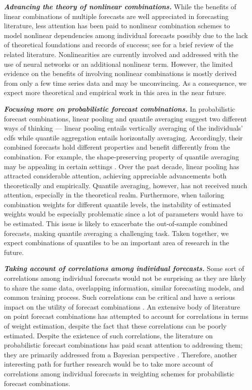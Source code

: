 \documentclass[11pt]{article}
\begin{document}
\textbf{\textit{Advancing the theory of nonlinear combinations.}} While the benefits of linear combinations of multiple forecasts are well appreciated in forecasting literature, less attention has been paid to nonlinear combination schemes to model nonlinear dependencies among individual forecasts possibly due to the lack of theoretical foundations and records of success; see \citet{Timmermann2006-en} for a brief review of the related literature. Nonlinearities are currently involved and addressed with the use of neural networks or an additional nonlinear term. However, the limited evidence on the benefits of involving nonlinear combinations is mostly derived from only a few time series data and may be unconvincing. As a consequence, we expect more theoretical and empirical work in this area in the near future.

\textbf{\textit{Focusing more on probabilistic forecast combinations.}} In probabilistic forecast combinations, linear pooling and quantile averaging suggest two different ways of thinking --- linear pooling entails vertically averaging of the individuals' cdfs while quantile aggregation entails horizontally averaging. Accordingly, their combined forecasts hold different properties and benefit differently from the combination. For example, the shape-preserving property of quantile averaging may be appealing in certain settings \citep{Lichtendahl2013-rt}. Over the past decade, linear pooling has attracted considerable attention, achieving appreciable advancements both theoretically and empirically. Quantile averaging, however, has not received much attention, especially in the theoretical realm. Furthermore, when tailoring combination weights for different quantile levels, the instability of estimated weights would be especially problematic since a lot of parameters would have to be estimated. This issue is likely to exacerbate the out-of-sample combined forecasts, making quantile averaging a challenging task. Taken together, we expect combinations of quantiles to be an important area of research in the future.

\textbf{\textit{Taking account of correlations among individual forecasts.}} Some sort of correlations among individual forecasts would not be surprising as they are likely to share the same data, overlapping information, similar forecasting models, and common training process. Such correlations can be critical and have a serious impact on the utility of forecast combinations \citep{De_Menezes2000-vd}. An extensive body of literature on point forecast combinations has attempted to account for correlations in terms of weight estimation, despite the fact that these correlations can be poorly estimated. Despite the existence of such correlations, the literature on probabilistic forecast combinations has paid scant attention to addressing them; they are primarily addressed from a Bayesian perspective \citep[e.g.,][]{Winkler1981-bn,McAlinn2019-kn}. Therefore, another interesting path for further research would be to take more account of correlations among individual forecasts in weighting schemes for probabilistic forecast combinations.
\end{document}
